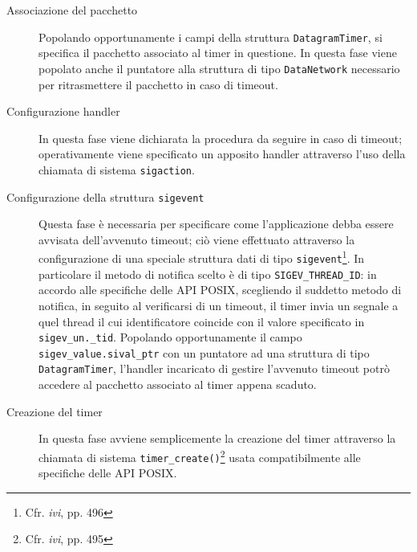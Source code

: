\documentclass[10pt,a4paper, titlepage]{report}
\begin{document}
\begin{description}
\item[Associazione del pacchetto] Popolando opportunamente i campi della struttura \texttt{DatagramTimer}, si specifica il pacchetto associato al timer in questione. In questa fase viene popolato anche il puntatore alla struttura di tipo \texttt{DataNetwork} necessario per ritrasmettere il pacchetto in caso di timeout.
\item[Configurazione handler] In questa fase viene dichiarata la procedura da seguire in caso di timeout; operativamente viene specificato un apposito handler attraverso l'uso della chiamata di sistema \texttt{sigaction}.
\item[Configurazione della struttura \texttt{sigevent}] Questa fase è necessaria per specificare come l'applicazione debba essere avvisata dell'avvenuto timeout; ciò viene effettuato attraverso la configurazione di una speciale struttura dati di tipo \texttt{sigevent}\footnote{Cfr. \textit{ivi}, pp. 496}. In particolare il metodo di notifica scelto è di tipo  \texttt{SIGEV\_THREAD\_ID}: in accordo alle specifiche delle API POSIX, scegliendo il suddetto metodo di notifica, in seguito al verificarsi di un timeout, il timer invia un segnale a quel thread il cui identificatore coincide con il valore specificato in \texttt{sigev\_un.\_tid}. Popolando opportunamente il campo \texttt{sigev\_value.sival\_ptr} con un puntatore ad una struttura di tipo \texttt{DatagramTimer}, l'handler incaricato di gestire l'avvenuto timeout potrò accedere al pacchetto associato al timer appena scaduto.
\item[Creazione del timer] In questa fase avviene semplicemente la creazione del timer attraverso la chiamata di sistema \texttt{timer\_create()}\footnote{Cfr. \textit{ivi}, pp. 495} usata compatibilmente alle specifiche delle API POSIX. 
\end{description}
\end{document}
